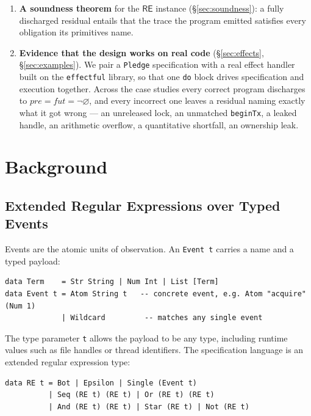 \documentclass[acmsmall,screen]{acmart}
\newcommand{\RE}{\mathsf{RE}}
\newcommand{\pre}{\mathit{pre}}
\newcommand{\fut}{\mathit{fut}}
\newcommand{\univ}{\neg\varnothing}
\begin{document}
\begin{enumerate}
  \item \textbf{A soundness theorem} for the $\RE$ instance
        (\S\ref{sec:soundness}): a fully discharged residual entails that
        the trace the program emitted satisfies every obligation its
        primitives name.

  \item \textbf{Evidence that the design works on real code}
        (\S\ref{sec:effects}, \S\ref{sec:examples}).
        We pair a \lstinline{Pledge} specification with a real effect
        handler built on the \lstinline{effectful} library, so that one
        \lstinline{do} block drives specification and execution together.
        Across the case studies every correct program discharges to
        $\pre = \fut = \univ$, and every incorrect one leaves a residual
        naming exactly what it got wrong --- an unreleased lock, an
        unmatched \lstinline{beginTx}, a leaked handle, an arithmetic
        overflow, a quantitative shortfall, an ownership leak.
\end{enumerate}

\section{Background}
\label{sec:background}

\subsection{Extended Regular Expressions over Typed Events}
\label{sec:re}

Events are the atomic units of observation.
An \lstinline{Event t} carries a name and a typed payload:

\begin{lstlisting}
data Term    = Str String | Num Int | List [Term]
data Event t = Atom String t   -- concrete event, e.g. Atom "acquire" (Num 1)
             | Wildcard         -- matches any single event
\end{lstlisting}

\noindent
The type parameter \lstinline{t} allows the payload to be any type,
including runtime values such as file handles or thread identifiers.
The specification language is an extended regular expression type:

\begin{lstlisting}
data RE t = Bot | Epsilon | Single (Event t)
          | Seq (RE t) (RE t) | Or (RE t) (RE t)
          | And (RE t) (RE t) | Star (RE t) | Not (RE t)
\end{lstlisting}
\end{document}
